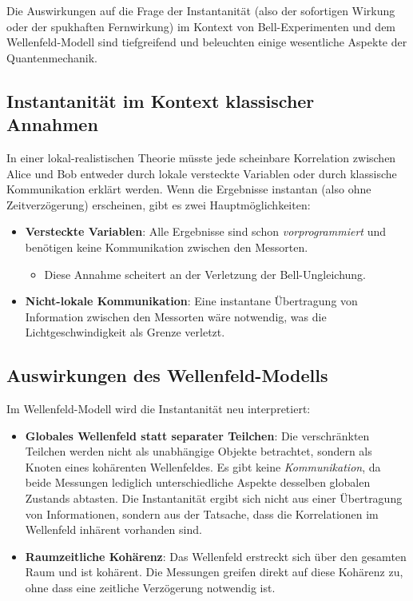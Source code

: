 \documentclass[12pt,a4paper]{article}
\begin{document}
	Die Auswirkungen auf die Frage der Instantanität (also der sofortigen Wirkung oder der spukhaften Fernwirkung) im Kontext von Bell-Experimenten und dem Wellenfeld-Modell sind tiefgreifend und beleuchten einige wesentliche Aspekte der Quantenmechanik.
	\subsection{Instantanität im Kontext klassischer Annahmen}
	
	In einer lokal-realistischen Theorie müsste jede scheinbare Korrelation zwischen Alice und Bob entweder durch lokale versteckte Variablen oder durch klassische Kommunikation erklärt werden. Wenn die Ergebnisse instantan (also ohne Zeitverzögerung) erscheinen, gibt es zwei Hauptmöglichkeiten:
	\begin{itemize}
		\item \textbf{Versteckte Variablen}: Alle Ergebnisse sind schon \textit{vorprogrammiert} und benötigen keine Kommunikation zwischen den Messorten.
		\begin{itemize}
			\item Diese Annahme scheitert an der Verletzung der Bell-Ungleichung.
		\end{itemize}
		\item \textbf{Nicht-lokale Kommunikation}: Eine instantane Übertragung von Information zwischen den Messorten wäre notwendig, was die Lichtgeschwindigkeit als Grenze verletzt.
	\end{itemize}
	
	\subsection{Auswirkungen des Wellenfeld-Modells}
	
	Im Wellenfeld-Modell wird die Instantanität neu interpretiert:
	\begin{itemize}
		\item \textbf{Globales Wellenfeld statt separater Teilchen}: Die verschränkten Teilchen werden nicht als unabhängige Objekte betrachtet, sondern als Knoten eines kohärenten Wellenfeldes. Es gibt keine \textit{Kommunikation}, da beide Messungen lediglich unterschiedliche Aspekte desselben globalen Zustands abtasten. Die Instantanität ergibt sich nicht aus einer Übertragung von Informationen, sondern aus der Tatsache, dass die Korrelationen im Wellenfeld inhärent vorhanden sind.
		\item \textbf{Raumzeitliche Kohärenz}: Das Wellenfeld erstreckt sich über den gesamten Raum und ist kohärent. Die Messungen greifen direkt auf diese Kohärenz zu, ohne dass eine zeitliche Verzögerung notwendig ist.
	\end{itemize}
	
\end{document}
